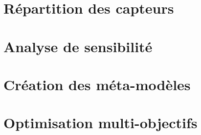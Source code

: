 \documentclass[11pt, twoside, openright]{JeremyThesis}
\begin{document}
\begin{thesisAppendices}

% 

% 
% 

% 

\chapter{Répartition des capteurs} %
\label{cha:repartition_des_capteurs}


\chapter{Analyse de sensibilité} %
\label{cha:analyse_de_sensibilite}


\chapter{Création des méta-modèles} %
\label{cha:creation_des_meta_modeles}


\chapter{Optimisation multi-objectifs} %
\label{cha:optimisation_multi_objectifs}


\end{thesisAppendices}



\thesisPrintbibliography



\end{document}
